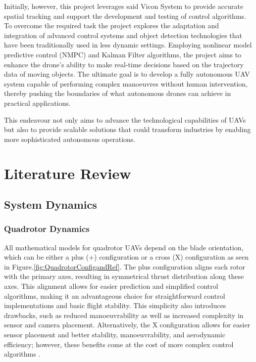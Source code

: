 \documentclass{UoNMCHA}
\numberwithin{equation}{section}
\begin{document}
Initially, however, this project leverages said Vicon System to provide accurate spatial tracking and support the development and testing of control algorithms. To overcome the required task the project explores the adaptation and integration of advanced control systems and object detection technologies that have been traditionally used in less dynamic settings. Employing nonlinear model predictive control (NMPC) and Kalman Filter algorithms, the project aims to enhance the drone's ability to make real-time decisions based on the trajectory data of moving objects. The ultimate goal is to develop a fully autonomous UAV system capable of performing complex manoeuvres without human intervention, thereby pushing the boundaries of what autonomous drones can achieve in practical applications. 

This endeavour not only aims to advance the technological capabilities of UAVs but also to provide scalable solutions that could transform industries by enabling more sophisticated autonomous operations.



\section{Literature Review}


\subsection{System Dynamics}

\subsubsection{Quadrotor Dynamics}
All mathematical models for quadrotor UAVs depend on the blade orientation, which can be either a plus (+) configuration or a cross (X) configuration as seen in Figure.\ref{fig:QuadrotorConfigandRef}. The plus configuration aligns each rotor with the primary axes, resulting in symmetrical thrust distribution along these axes. This alignment allows for easier prediction and simplified control algorithms, making it an advantageous choice for straightforward control implementations and basic flight stability. This simplicity also introduces drawbacks, such as reduced manoeuvrability as well as increased complexity in sensor and camera placement. Alternatively, the X configuration allows for easier sensor placement and better stability, manoeuvrability, and aerodynamic efficiency; however, these benefits come at the cost of more complex control algorithms \textcolor{red}{\cite{article:CrossVsPlus}}.  
\end{document}
